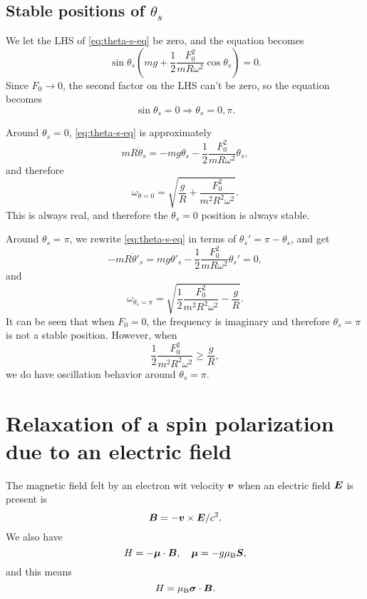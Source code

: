 \documentclass[hyperref, a4paper]{article}
\newcommand*{\muB}{\mu_{\text{B}}}
\begin{document}
\subsection{Stable positions of $\theta_s$}

We let the LHS of \eqref{eq:theta-s-eq} be zero, 
and the equation becomes 
\[
    \sin \theta_s \left(
        mg + \frac{1}{2} \frac{F_0^2}{m R \omega^2} \cos \theta_s
    \right) = 0.
\]
Since $F_0 \to 0$, the second factor on the LHS can't be zero, 
so the equation becomes 
\begin{equation}
    \sin \theta_s = 0 \Rightarrow \theta_s = 0, \pi.
\end{equation}

Around $\theta_s = 0$, \eqref{eq:theta-s-eq} is approximately 
\[
    m R \ddot{\theta}_s = - mg \theta_s - \frac{1}{2} \frac{F_0^2}{m R \omega^2} \theta_s, 
\]
and therefore 
\begin{equation}
    \omega_{\theta = 0} = \sqrt{
        \frac{g}{R} + \frac{F_0^2}{m^2 R^2 \omega^2}
    }.
\end{equation}
This is always real, and therefore the $\theta_s = 0$ position is always stable.

Around $\theta_s = \pi$, we rewrite \eqref{eq:theta-s-eq} in terms of $\theta_s' = \pi - \theta_s$, 
and get 
\[
    - m R \ddot{\theta}'_s = mg \theta'_s - \frac{1}{2} \frac{F_0^2}{m R \omega^2} \theta_s' = 0,
\]
and 
\begin{equation}
    \omega_{\theta_s = \pi} = \sqrt{\frac{1}{2} \frac{F_0^2}{m^2 R^2 \omega^2} - \frac{g}{R}}.
\end{equation}
It can be seen that when $F_0 = 0$, 
the frequency is imaginary and therefore $\theta_s = \pi$ 
is not a stable position. 
However, when 
\begin{equation}
    \frac{1}{2} \frac{F_0^2}{m^2 R^2 \omega^2} \geq \frac{g}{R},
\end{equation}
we do have oscillation behavior around $\theta_s = \pi$.

\section{Relaxation of a spin polarization due to an electric field}

The magnetic field felt by an electron wit velocity $\vb*{v}$ 
when an electric field $\vb*{E}$ is present is 
\begin{equation}
    \vb*{B}=-\vb*{v} \times \vb*{E} / c^2.
\end{equation}
We also have 
\begin{equation}
    H = - \vb*{\mu} \cdot \vb*{B}, \quad \vb*{\mu} = - g \muB \vb*{S},
\end{equation}
and this means 
\begin{equation}
    H = \muB \vb*{\sigma} \cdot \vb*{B}.
\end{equation}
\end{document}
